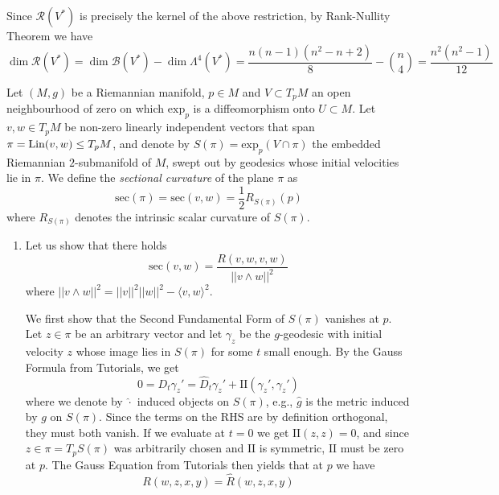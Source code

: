 \documentclass[a4paper, 12pt]{article}
\begin{document}
\begin{Exercise}
\begin{enumerate}[label=(\roman*)]
            Since $\mathcal{R}(V^*)$ is precisely the kernel of the above restriction,
            by Rank-Nullity Theorem we have
            \[
                \dim\mathcal{R}(V^*)
                = \dim\mathcal{B}(V^*) - \dim\Lambda^4(V^*)
                = \frac{n(n-1)(n^2-n+2)}{8} - \binom{n}{4}
                = \frac{n^2(n^2-1)}{12}
            \]
    \end{enumerate}
\end{Exercise}

\begin{Exercise}
    Let $(M, g)$ be a Riemannian manifold, $p \in M$ and $V \subset T_pM$ an
    open neighbourhood of zero on which $\text{exp}_p$ is a diffeomorphism onto
    $U \subset M$.
    Let $v, w \in T_pM$ be non-zero linearly independent vectors that span $\pi = \operatorname{Lin}(v, w) \leq T_pM$,
    and denote by $S(\pi) = \text{exp}_p(V \cap \pi)$ the embedded Riemannian $2$-submanifold of $M$,
    swept out by geodesics whose initial velocities lie in $\pi$.
    We define the \emph{sectional curvature} of the plane $\pi$ as
    \[
        \text{sec}(\pi) = \text{sec}(v, w) = \frac{1}{2} R_{S(\pi)}(p)
    \]
    where $R_{S(\pi)}$ denotes the intrinsic scalar curvature of $S(\pi)$.
    \begin{enumerate}[label=(\roman*)]
        \item Let us show that there holds
            \[
                \text{sec}(v, w) = \frac{R(v, w, v, w)}{|| v \wedge w ||^2}
            \]
            where $||v \wedge w||^2 = ||v||^2||w||^2 - \langle v, w \rangle^2$.
            
            We first show that the Second Fundamental Form of $S(\pi)$ vanishes at $p$.
            Let $z \in \pi$ be an arbitrary vector and let $\gamma_z$ be the $g$-geodesic
            with initial velocity $z$ whose image lies in $S(\pi)$ for some $t$ small enough.
            By the Gauss Formula from Tutorials, we get
            \[
                0 = D_t\gamma_z' = \hat{D}_t\gamma_z' + \text{II}(\gamma_z', \gamma_z')
            \]
            where we denote by $\hat{\cdot}$ induced objects on $S(\pi)$, e.g., $\hat{g}$ is the metric induced by $g$ on $S(\pi)$.
            Since the terms on the RHS are by definition orthogonal, they must both vanish.
            If we evaluate at $t = 0$ we get $\text{II}(z, z) = 0$, and since $z \in \pi = T_pS(\pi)$
            was arbitrarily chosen and $\text{II}$ is symmetric, $\text{II}$ must be zero at $p$.
            The Gauss Equation from Tutorials then yields that at $p$ we have
            \[
                R(w, z, x, y) = \hat{R}(w, z, x, y)
            \]
            

\end{enumerate}
\end{Exercise}
\end{document}

